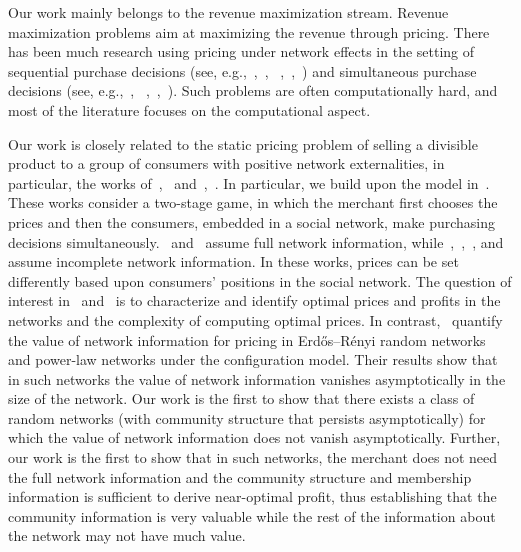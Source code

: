 	Our work mainly belongs to the revenue maximization stream. Revenue maximization problems aim at maximizing the revenue through pricing. There has been much research using pricing under
	network effects in
	the setting of sequential purchase decisions
	(see, e.g.,~\cite{hartline2008optimal},~\cite{arthur2009pricing},
~\cite{haghpanah2013optimal},~\cite{crapis2016monopoly},~\cite{zhou2018optimal}) and
	simultaneous purchase decisions (see, e.g.,~\cite{campbell2013word},
~\cite{du2016optimal},~\cite{chen2018competitive},~\cite{cohen2013designing}). Such
	problems are often computationally hard, and most of the literature focuses
	on the computational  aspect.
	
	Our work is closely related to the static pricing problem of selling
	a divisible product to a group of consumers with positive network
	externalities, in particular, the works of~\cite{huang2019value, huang2022value, candogan2012optimal},~\cite{bloch2013pricing} and~\cite{fainmesser2015pricing},~\cite{Baron-2022}. In particular, we build upon the model in~\cite{huang2022value}. These
	works consider a two-stage game, in which the merchant first
	chooses the prices and then the consumers, embedded in a social
	network, make purchasing decisions simultaneously.~\cite{candogan2012optimal} and~\cite{bloch2013pricing} assume full network information, while~\cite{fainmesser2015pricing},~\cite{Baron-2022},~\cite{huang2019value}, and~\cite{huang2022value} assume incomplete network information. In
	these works, prices can be set differently based upon consumers'
	positions in the social network. The question of interest in~\cite{candogan2012optimal, bloch2013pricing} and~\cite{fainmesser2015pricing} is to
	characterize and identify optimal prices and profits in the networks
	and the complexity of computing optimal prices. In contrast,~\cite{huang2019value, huang2022value} quantify the value of network information for pricing in Erd\H{o}s--R\'{e}nyi random networks and power-law networks under the configuration model. Their results show that in such networks the value of network information vanishes asymptotically in the size of the network. Our work is the first to show that there exists a class of random networks (with community structure that persists asymptotically) for which the value of network information does not vanish asymptotically. Further, our work is the first to show that in such networks, the merchant does not need the full network information and the community structure and membership  information is sufficient to derive near-optimal profit, thus establishing that the community information is very valuable while the rest of the information about the network may not have much value.
	
